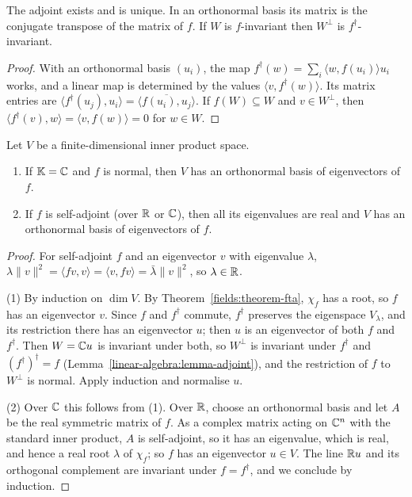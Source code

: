 \begin{lemma}\label{linear-algebra:lemma-adjoint}
The adjoint exists and is unique. In an orthonormal basis its matrix is the conjugate transpose of the
matrix of $f$. If $W$ is $f$-invariant then $W^\perp$ is $f^\dagger$-invariant.
\end{lemma}

\begin{proof}
With an orthonormal basis $(u_i)$, the map $f^\dagger(w) = \sum_i \langle w, f(u_i) \rangle u_i$ works, and a linear map
is determined by the values $\langle v, f^\dagger(w) \rangle$. Its matrix entries are
$\langle f^\dagger(u_j), u_i \rangle = \overline{\langle f(u_i), u_j\rangle}$. If $f(W) \subseteq W$ and $v \in W^\perp$, then
$\langle f^\dagger(v), w \rangle = \langle v, f(w) \rangle = 0$ for $w \in W$.
\end{proof}

\begin{theorem}\label{linear-algebra:theorem-spectral}
Let $V$ be a finite-dimensional inner product space.
\begin{enumerate}
\item If $\mathbb{K} = \mathbb{C}$ and $f$ is normal, then $V$ has an orthonormal basis of eigenvectors of $f$.
\item If $f$ is self-adjoint (over $\mathbb{R}$ or $\mathbb{C}$), then all its eigenvalues are real and $V$ has an orthonormal
basis of eigenvectors of $f$.
\end{enumerate}
\end{theorem}

\begin{proof}
For self-adjoint $f$ and an eigenvector $v$ with eigenvalue $\lambda$,
$\lambda\|v\|^2 = \langle f v, v \rangle = \langle v, fv \rangle = \bar\lambda\|v\|^2$, so $\lambda \in \mathbb{R}$.

(1) By induction on $\dim V$. By Theorem~\ref{fields:theorem-fta}, $\chi_f$ has a root, so $f$ has an eigenvector
$v$. Since $f$ and $f^\dagger$ commute, $f^\dagger$ preserves the eigenspace $V_\lambda$, and its restriction there has
an eigenvector $u$; then $u$ is an eigenvector of both $f$ and $f^\dagger$. Then $W = \mathbb{C} u$ is invariant under
both, so $W^\perp$ is invariant under $f^\dagger$ and $(f^\dagger)^\dagger = f$ (Lemma~\ref{linear-algebra:lemma-adjoint}),
and the restriction of $f$ to $W^\perp$ is normal. Apply induction and normalise $u$.

(2) Over $\mathbb{C}$ this follows from (1). Over $\mathbb{R}$, choose an orthonormal basis and let $A$ be the real symmetric
matrix of $f$. As a complex matrix acting on $\mathbb{C}^n$ with the standard inner product, $A$ is self-adjoint, so
it has an eigenvalue, which is real, and hence a real root $\lambda$ of $\chi_f$; so $f$ has an eigenvector $u \in V$.
The line $\mathbb{R} u$ and its orthogonal complement are invariant under $f = f^\dagger$, and we conclude by induction.
\end{proof}

